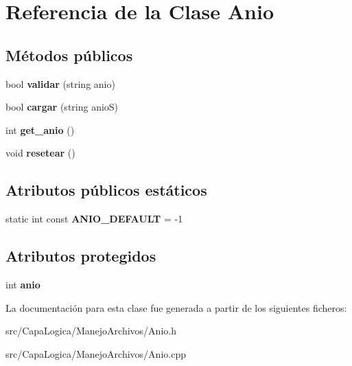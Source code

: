 \hypertarget{class_anio}{\section{\-Referencia de la \-Clase \-Anio}
\label{class_anio}
}
\subsection*{\-Métodos públicos}
\begin{DoxyCompactItemize}
\item 
\hypertarget{class_anio_afc9033ac57972160b3324be97d321502}{bool {\bfseries validar} (string anio)}\label{class_anio_afc9033ac57972160b3324be97d321502}

\item 
\hypertarget{class_anio_a780440617cb4e95b872c769bbc4cb818}{bool {\bfseries cargar} (string anio\-S)}\label{class_anio_a780440617cb4e95b872c769bbc4cb818}

\item 
\hypertarget{class_anio_aeebb1ff294f13bd7f53d6991c626e042}{int {\bfseries get\-\_\-anio} ()}\label{class_anio_aeebb1ff294f13bd7f53d6991c626e042}

\item 
\hypertarget{class_anio_a244f14202ebf167746bad2d191247282}{void {\bfseries resetear} ()}\label{class_anio_a244f14202ebf167746bad2d191247282}

\end{DoxyCompactItemize}
\subsection*{\-Atributos públicos estáticos}
\begin{DoxyCompactItemize}
\item 
\hypertarget{class_anio_af3f742b00d62a84ee438ff5ca156b96c}{static int const {\bfseries \-A\-N\-I\-O\-\_\-\-D\-E\-F\-A\-U\-L\-T} = -\/1}\label{class_anio_af3f742b00d62a84ee438ff5ca156b96c}

\end{DoxyCompactItemize}
\subsection*{\-Atributos protegidos}
\begin{DoxyCompactItemize}
\item 
\hypertarget{class_anio_a1f8d691b32e635e2f201bb754fd2aea9}{int {\bfseries anio}}\label{class_anio_a1f8d691b32e635e2f201bb754fd2aea9}

\end{DoxyCompactItemize}


\-La documentación para esta clase fue generada a partir de los siguientes ficheros\-:\begin{DoxyCompactItemize}
\item 
src/\-Capa\-Logica/\-Manejo\-Archivos/\-Anio.\-h\item 
src/\-Capa\-Logica/\-Manejo\-Archivos/\-Anio.\-cpp\end{DoxyCompactItemize}
